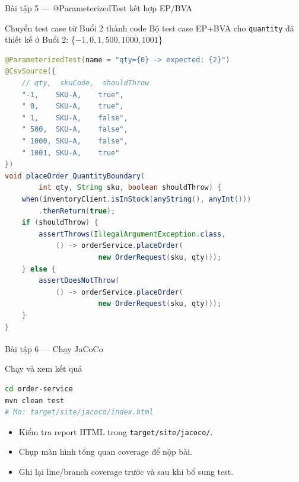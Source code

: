 \documentclass[aspectratio=169,10pt]{beamer}
\newcommand{\sref}[1]{\textsuperscript{\scriptsize\cite{#1}}}
\begin{document}
\begin{frame}[fragile,shrink=30]{Bài tập 5 --- @ParameterizedTest kết hợp EP/BVA}
  \begin{block}{Chuyển test case từ Buổi 2 thành code}
    Bộ test case EP+BVA cho \texttt{quantity} đã thiết kế ở Buổi 2:
    \{$-1, 0, 1, 500, 1000, 1001$\}
  \end{block}

\begin{lstlisting}[language=java]
@ParameterizedTest(name = "qty={0} -> expected: {2}")
@CsvSource({
    // qty,  skuCode,  shouldThrow
    "-1,    SKU-A,    true",
    " 0,    SKU-A,    true",
    " 1,    SKU-A,    false",
    " 500,  SKU-A,    false",
    " 1000, SKU-A,    false",
    " 1001, SKU-A,    true"
})
void placeOrder_QuantityBoundary(
        int qty, String sku, boolean shouldThrow) {
    when(inventoryClient.isInStock(anyString(), anyInt()))
        .thenReturn(true);
    if (shouldThrow) {
        assertThrows(IllegalArgumentException.class,
            () -> orderService.placeOrder(
                      new OrderRequest(sku, qty)));
    } else {
        assertDoesNotThrow(
            () -> orderService.placeOrder(
                      new OrderRequest(sku, qty)));
    }
}
\end{lstlisting}
\end{frame}

\begin{frame}[fragile]{Bài tập 6 --- Chạy JaCoCo\sref{jacoco}}
  \begin{block}{Chạy và xem kết quả}
\begin{lstlisting}[language=bash,style=nonumber]
cd order-service
mvn clean test
# Mo: target/site/jacoco/index.html
\end{lstlisting}
  \end{block}

  \begin{itemize}
    \item Kiểm tra report HTML trong \texttt{target/site/jacoco/}.
    \item Chụp màn hình tổng quan coverage để nộp bài.
    \item Ghi lại line/branch coverage trước và sau khi bổ sung test.
  \end{itemize}
\end{frame}
\end{document}
